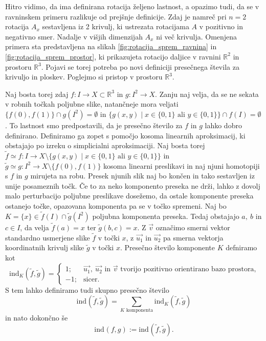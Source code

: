 \documentclass[mat1]{fmfdelo}
\newcommand{\R}{\mathbb R}
\newcommand{\ind}[3][]{\text{ind}_{#1}(#2, #3)}
\begin{document}
Hitro vidimo, da ima definirana rotacija željeno lastnost, a opazimo tudi, da se v ravninskem primeru razlikuje od prejšnje definicije. Zdaj je namreč pri $n=2$ rotacija $A_x$ sestavljena iz 2 krivulj, ki ustrezata rotacijama $A$ v pozitivno in negativno smer. Nadalje v višjih dimenzijah $A_x$ ni več krivulja. Omenjena primera sta predstavljena na slikah \ref{fig:rotacija_sprem_ravnina} in \ref{fig:rotacija_sprem_prostor}, ki prikazujeta rotacijo daljice v ravnini $\R^2$ in prostoru $\R^3$. Pojavi se torej potreba po novi definiciji presečnega števila za krivuljo in ploskev. Poglejmo si pristop v prostoru $\R^3$.

Naj bosta torej zdaj $f \colon I \to X \subset \R^3$ in $g \colon I^2 \to X$. Zanju naj velja, da se ne sekata v robnih točkah poljubne slike, natančneje mora veljati $\{f(0), f(1)\} \cap g(I^2) = \emptyset$ in $\{g(x, y) \mid x \in \{0, 1\} \text{ ali } y \in \{0, 1\} \} \cap f(I) = \emptyset$. To lastnost smo predpostavili, da je presečno število za $f$ in $g$ lahko dobro definirano. Definiramo ga zopet s pomočjo kosoma linearnih aproksimacij, ki obstajajo po izreku o simplicialni aproksimaciji. Naj bosta torej $\widetilde{f} \simeq f \colon I \to X \setminus \{g(x, y) \mid x \in \{0, 1\} \text{ ali } y \in \{0, 1\} \}$ in $\widetilde{g} \simeq g\colon I^2 \to X \setminus \{f(0), f(1)\}$ kosoma linearni preslikavi in naj njuni homotopiji s $f$ in $g$ mirujeta na robu. Presek njunih slik naj bo končen in tako sestavljen iz unije posameznih točk. Če to za neko komponento preseka ne drži, lahko z dovolj malo perturbacijo poljubne preslikave dosežemo, da ostale komponente preseka ostanejo točke, opazovana komponenta pa se v točko spremeni. Naj bo $K = \{x\} \in \widetilde{f}(I) \cap \widetilde{g}(I^2)$ poljubna komponenta preseka. Tedaj obstajajo $a,\ b$ in $c \in I$, da velja $\widetilde{f}(a) = x$ ter $\widetilde{g}(b, c) = x$. Z $\overrightarrow{v}$ označimo smerni vektor standardno usmerjene slike $\widetilde{f}$ v točki $x$, z $\overrightarrow{u_1}$ in $\overrightarrow{u_2}$ pa smerna vektorja koordinatnih krivulj slike $\widetilde{g}$ v točki $x$. Presečno število komponente $K$ defniramo kot
\begin{equation*}
\ind[K]{\widetilde{f}}{\widetilde{g}} = \begin{cases}
1; &\overrightarrow{u_1},\ \overrightarrow{u_2} \text{ in } \overrightarrow{v} \text{ tvorijo pozitivno orientirano bazo prostora,}\\
-1; &\text{sicer}.
\end{cases}
\end{equation*}
S tem lahko definiramo tudi skupno presečno število \[ \ind{\widetilde{f}}{\widetilde{g}} = \sum_{K \text{ komponenta}} \ind[K]{\widetilde{f}}{\widetilde{g}} \] in nato dokončno še \[ \ind{f}{g} := \ind{\widetilde{f}}{\widetilde{g}}. \]
\end{document}
